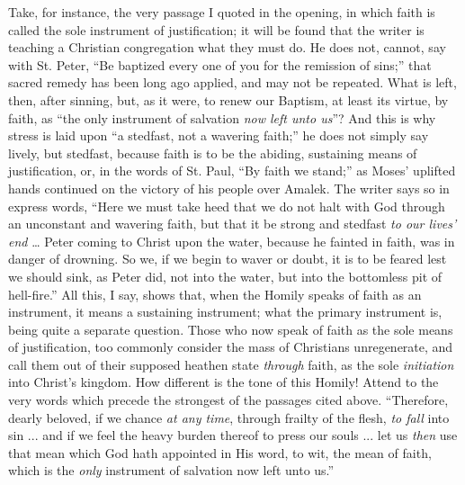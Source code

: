 Take, for instance, the very passage I quoted in the opening, in
which faith is called the sole instrument of justification; it
will be found that the writer is teaching a Christian congregation
what they must do. He does not, cannot, say with St. Peter, ``Be
baptized every one of you for the remission of sins;'' that sacred
remedy has been long ago applied, and may not be repeated. What is
left, then, after sinning, but, as it were, to renew our Baptism, at
least its virtue, by faith, as ``the only instrument of salvation \emph{now
left unto us}''? And this is why stress is laid upon ``a
stedfast, not a wavering faith;'' he does not simply say lively,
but stedfast, because faith is to be the abiding, sustaining means of
justification, or, in the words of St. Paul, ``By faith we
stand;'' as Moses' uplifted hands continued on the victory of his
people over Amalek. The writer says so in express words, ``Here we
must take heed that we do not halt with God through an unconstant and
wavering faith, but that it be strong and stedfast \emph{to our lives'
end} … Peter coming to Christ upon the water, because he fainted
in faith, was in danger of drowning. So we, if we begin to waver or
doubt, it is to be feared lest we should sink, as Peter did, not into
the water, but into the bottomless pit of hell-fire.'' All this, I
say, shows that, when the Homily speaks of faith as an instrument, it
means a sustaining instrument; what the primary instrument is, being
quite a separate question. Those who now speak of faith as the sole
means of justification, too commonly consider the mass of Christians
unregenerate, and call them out of their supposed heathen state \emph{through}
faith, as the sole \emph{initiation} into Christ's kingdom. How
different is the tone of this Homily! Attend to the very words which
precede the strongest of the passages cited above.
``Therefore, dearly beloved, if we chance \emph{at any time},
through frailty of the flesh, \emph{to fall} into sin ... and if we
feel the heavy burden thereof to press our souls ... let us \emph{then}
use that mean which God hath appointed in His word, to wit, the mean
of faith, which is the \emph{only} instrument of salvation now left
unto us.''

